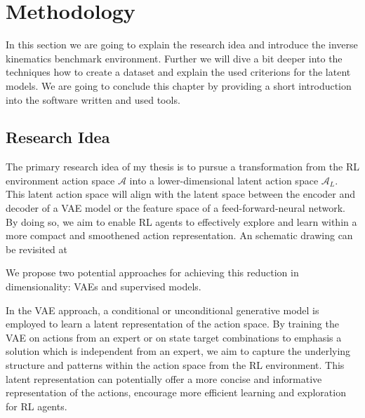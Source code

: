 \chapter{Methodology}\label{chap:Methodology}

In this section we are going to explain the research idea and introduce the inverse kinematics benchmark environment. Further we will dive a bit deeper into the techniques how to create a dataset and explain the used criterions for the latent models. We are going to conclude this chapter by providing a short introduction into the software written and used tools.

\section{Research Idea}

The primary research idea of my thesis is to pursue a transformation from the RL environment action space $\mathcal{A}$ into a lower-dimensional latent action space $\mathcal{A}_L$. This latent action space will align with the latent space between the encoder and decoder of a VAE model or the feature space of a feed-forward-neural network. By doing so, we aim to enable RL agents to effectively explore and learn within a more compact and smoothened action representation. An schematic drawing can be revisited at 

We propose two potential approaches for achieving this reduction in dimensionality: VAEs and supervised models.

In the VAE approach, a conditional or unconditional generative model is employed to learn a latent representation of the action space. By training the VAE on actions from an expert or on state target combinations to emphasis a solution which is independent from an expert, we aim to capture the underlying structure and patterns within the action space from the RL environment. This latent representation can potentially offer a more concise and informative representation of the actions, encourage more efficient learning and exploration for RL agents.

